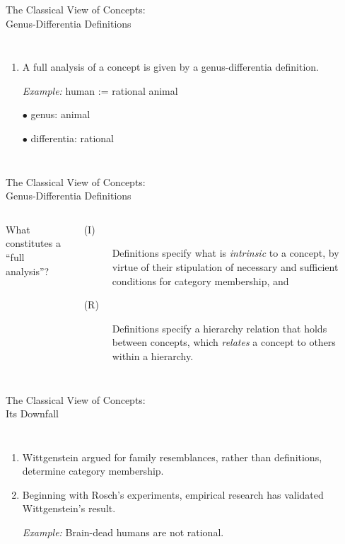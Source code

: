 \documentclass{beamer}
\begin{document}
\begin{frame}{The Classical View of Concepts: \\ Genus-Differentia Definitions}
\begin{columns}
\begin{enumerate}
	\item A full analysis of a concept is given by a genus-differentia definition.
\par\vspace{.125in}
\quad \emph{Example:} human := rational animal
\par\vspace{.125in}
\quad\quad\quad\quad $\bullet$ genus: animal
\par
\quad\quad\quad\quad $\bullet$ differentia: rational
\end{enumerate}
\end{columns}
\end{frame}

\begin{frame}{The Classical View of Concepts: \\ Genus-Differentia Definitions}
\begin{columns}
What constitutes a ``full analysis''?
\par\vspace{.125in}
\begin{description}
\item[(I)] Definitions specify what is \emph{intrinsic} to a concept, by virtue of their stipulation of necessary and sufficient conditions for category membership, and
\item[(R)] Definitions specify a hierarchy relation that holds between concepts, which \emph{relates} a concept to others within a hierarchy.
\end{description}
\end{columns}
\end{frame}

\begin{frame}{The Classical View of Concepts: \\ Its Downfall}
\begin{columns}
\begin{enumerate}
\item Wittgenstein argued for family resemblances, rather than definitions, determine category membership.
\vspace{.25in}
\item Beginning with Rosch's experiments, empirical research has validated Wittgenstein's result.
\par\vspace{.125in}
\quad\quad \emph{Example:} Brain-dead humans are not rational.
\par\vspace{.125in}

\end{enumerate}
\end{columns}
\end{frame}
\end{document}
